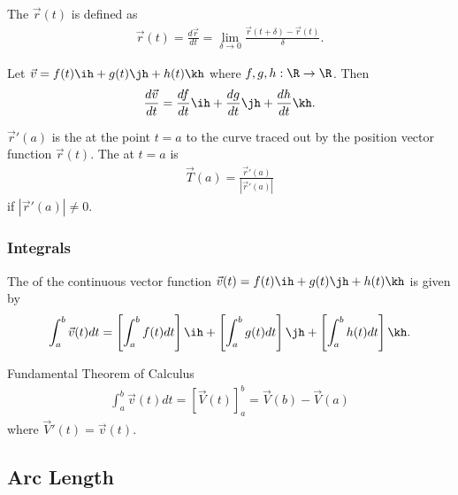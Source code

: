 \documentclass{article}
\begin{document}
\begin{definition}
    The  $\vec r(t)$ is defined as
    \begin{align*}
        \vec r(t) = \frac{d\vec r}{dt} = \lim_{\delta \to 0} \frac{\vec r(t+\delta)-\vec r(t)}{\delta}.
    \end{align*}
\end{definition}
\begin{theorem}
    Let $\vec v = f(t)\ih + g(t)\jh + h(t)\kh$ where $f,g,h: \R\to\R$. Then
    \begin{align*}
        \frac{d\vec v}{dt} = \frac{df}{dt}\ih + \frac{dg}{dt}\jh + \frac{dh}{dt}\kh.
    \end{align*}
\end{theorem}
\begin{definition}
    $\vec r'(a)$ is the  at the point $t=a$ to the curve traced out by the position vector function $\vec r(t)$.
    The  at $t=a$ is
    \begin{align*}
        \vec T(a) = \frac{\vec r'(a)}{|\vec r'(a)|}
    \end{align*}
    if $|\vec r'(a)| \not= 0$.
\end{definition}

\subsubsection{Integrals}

\begin{definition}
    The  of the continuous vector function $\vec v(t)=f(t)\ih + g(t)\jh + h(t)\kh$ is given by
    \begin{align*}
        \int_a^b \vec v(t)dt = \left[\int_a^b f(t)dt\right]\ih + \left[\int_a^b g(t) dt\right]\jh + \left[\int_a^b h(t)dt\right] \kh.
    \end{align*}
\end{definition}
\begin{theorem}{Fundamental Theorem of Calculus}
    \begin{align*}
        \int_a^b \vec v(t) dt = \left[\vec V(t)\right]^b_a = \vec V(b) - \vec V(a)
    \end{align*} 
    where $\vec V'(t) = \vec v(t)$.
\end{theorem}


\subsection{Arc Length}
\end{document}
